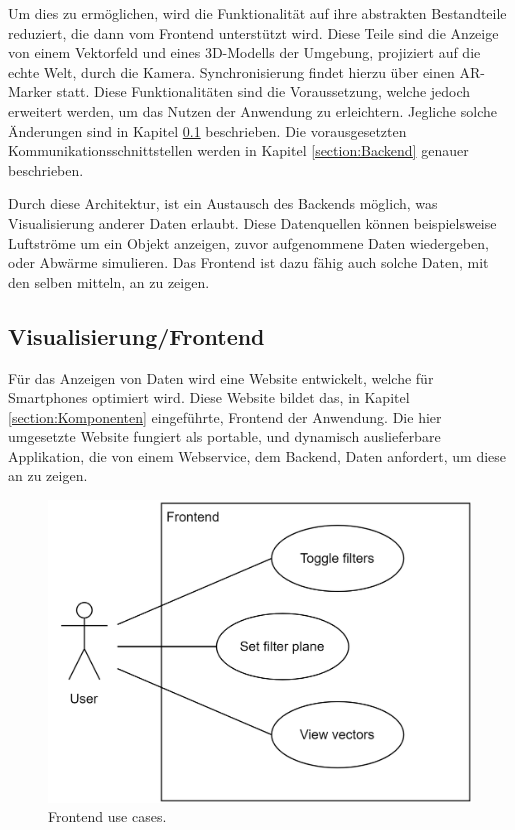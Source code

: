 Um dies zu ermöglichen, wird die Funktionalität auf ihre abstrakten
Bestandteile reduziert, die dann vom Frontend unterstützt wird.
Diese Teile sind die Anzeige von einem Vektorfeld und eines
3D-Modells der Umgebung, projiziert auf die echte Welt, durch die
Kamera. Synchronisierung findet hierzu über einen AR-Marker statt.
Diese Funktionalitäten sind die Voraussetzung, welche jedoch
erweitert werden, um das Nutzen der Anwendung zu erleichtern.
Jegliche solche Änderungen sind in Kapitel \ref{section:Frontend}
beschrieben. Die vorausgesetzten Kommunikationsschnittstellen werden
in Kapitel \ref{section:Backend} genauer beschrieben.

Durch diese Architektur, ist ein Austausch des Backends möglich,
was Visualisierung anderer Daten erlaubt. Diese Datenquellen können
beispielsweise Luftströme um ein Objekt anzeigen, zuvor aufgenommene
Daten wiedergeben, oder Abwärme simulieren. Das Frontend ist dazu
fähig auch solche Daten, mit den selben mitteln, an zu zeigen.



\subsection{Visualisierung/Frontend}
\label{section:Frontend}
\FloatBarrier

Für das Anzeigen von Daten wird eine Website entwickelt, welche
für Smartphones optimiert wird. Diese Website bildet das, in Kapitel
\ref{section:Komponenten} eingeführte, Frontend der Anwendung.
Die hier umgesetzte Website fungiert als portable, und dynamisch
auslieferbare Applikation, die von einem Webservice, dem Backend,
Daten anfordert, um diese an zu zeigen.

\begin{figure}
	\centering
	\includegraphics[width=.6\linewidth]{images/frontend/UseCases}
	\caption{Frontend use cases.}
	\label{fig:frontendUseCase}
\end{figure}

